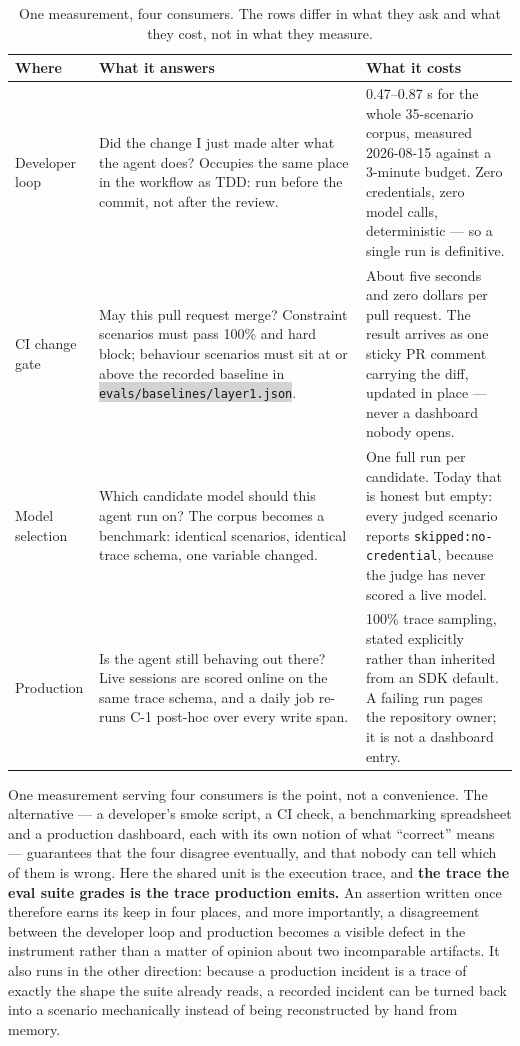 \documentclass[11pt,a4paper]{article}
\newcommand{\repopath}[1]{\colorbox{lightgray}{\texttt{#1}}}
\newcommand{\finding}[1]{{\color{primaryblue}\textbf{#1}}}
\begin{document}
\begin{table}[htbp]
\centering
\small
\begin{tabularx}{\linewidth}{@{}>{\raggedright\arraybackslash}p{2.5cm}XX@{}}
\toprule
\textbf{Where} & \textbf{What it answers} & \textbf{What it costs} \\
\midrule
Developer loop &
Did the change I just made alter what the agent does? Occupies the same place
in the workflow as TDD: run before the commit, not after the review. &
0.47--0.87 s for the whole 35-scenario corpus, measured 2026-08-15 against a
3-minute budget. Zero credentials, zero model calls, deterministic --- so a
single run is definitive. \\
\addlinespace
CI change gate &
May this pull request merge? Constraint scenarios must pass 100\% and hard
block; behaviour scenarios must sit at or above the recorded baseline in
\repopath{evals/baselines/layer1.json}. &
About five seconds and zero dollars per pull request. The result arrives as
one sticky PR comment carrying the diff, updated in place --- never a
dashboard nobody opens. \\
\addlinespace
Model selection &
Which candidate model should this agent run on? The corpus becomes a
benchmark: identical scenarios, identical trace schema, one variable changed. &
One full run per candidate. Today that is honest but empty: every judged
scenario reports \texttt{skipped:no-credential}, because the judge has never
scored a live model. \\
\addlinespace
Production &
Is the agent still behaving out there? Live sessions are scored online on the
same trace schema, and a daily job re-runs C-1 post-hoc over every write span. &
100\% trace sampling, stated explicitly rather than inherited from an SDK
default. A failing run pages the repository owner; it is not a dashboard
entry. \\
\bottomrule
\end{tabularx}
\caption{One measurement, four consumers. The rows differ in what they ask and
what they cost, not in what they measure.}
\label{tab:consumers}
\end{table}

One measurement serving four consumers is the point, not a convenience. The
alternative --- a developer's smoke script, a CI check, a benchmarking
spreadsheet and a production dashboard, each with its own notion of what
``correct'' means --- guarantees that the four disagree eventually, and that
nobody can tell which of them is wrong. Here the shared unit is the execution
trace, and \finding{the trace the eval suite grades is the trace production
emits.} An assertion written once therefore earns its keep in four places, and
more importantly, a disagreement between the developer loop and production
becomes a visible defect in the instrument rather than a matter of opinion
about two incomparable artifacts. It also runs in the other direction: because
a production incident is a trace of exactly the shape the suite already reads,
a recorded incident can be turned back into a scenario mechanically instead of
being reconstructed by hand from memory.
\end{document}
